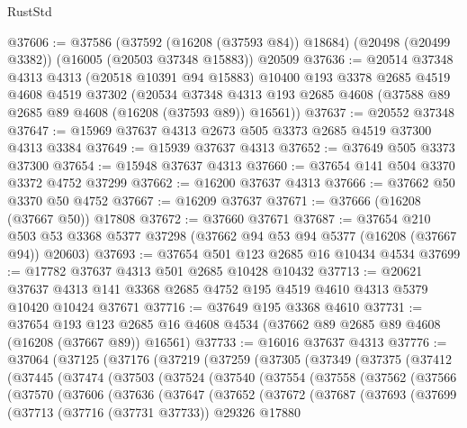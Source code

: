 \begin{lexlean}{RustStd}
\begin{coremodule}
@37606 := @37586
    (@37592 (@16208 (@37593 @84)) @18684)
    (@20498 (@20499 @3382))
    (@16005 (@20503 @37348 @15883))
    @20509
@37636 := @20514
    @37348
    @4313
    @4313
    (@20518 @10391 @94 @15883)
    @10400
    @193
    @3378
    @2685
    @4519
    @4608
    @4519
    @37302
    (@20534 @37348 @4313 @193 @2685 @4608 (@37588 @89 @2685 @89 @4608 (@16208 (@37593 @89)) @16561))
@37637 := @20552 @37348
@37647 := @15969 @37637 @4313 @2673 @505 @3373 @2685 @4519 @37300 @4313 @3384
@37649 := @15939 @37637 @4313
@37652 := @37649 @505 @3373 @37300
@37654 := @15948 @37637 @4313
@37660 := @37654 @141 @504 @3370 @3372 @4752 @37299
@37662 := @16200 @37637 @4313
@37666 := @37662 @50 @3370 @50 @4752
@37667 := @16209 @37637
@37671 := @37666 (@16208 (@37667 @50)) @17808
@37672 := @37660 @37671
@37687 := @37654
    @210
    @503
    @53
    @3368
    @5377
    @37298
    (@37662 @94 @53 @94 @5377 (@16208 (@37667 @94)) @20603)
@37693 := @37654 @501 @123 @2685 @16 @10434 @4534
@37699 := @17782 @37637 @4313 @501 @2685 @10428 @10432
@37713 := @20621
    @37637
    @4313
    @141
    @3368
    @2685
    @4752
    @195
    @4519
    @4610
    @4313
    @5379
    @10420
    @10424
    @37671
@37716 := @37649 @195 @3368 @4610
@37731 := @37654
    @193
    @123
    @2685
    @16
    @4608
    @4534
    (@37662 @89 @2685 @89 @4608 (@16208 (@37667 @89)) @16561)
@37733 := @16016 @37637 @4313
@37776 := @37064
    (@37125
      (@37176
        (@37219
          (@37259
            (@37305
              (@37349
                (@37375
                  (@37412
                    (@37445
                      (@37474
                        (@37503
                          (@37524
                            (@37540
                              (@37554
                                (@37558
                                  (@37562
                                    (@37566
                                      (@37570
                                        (@37606
                                          (@37636
                                            (@37647
                                              (@37652
                                                (@37672
                                                  (@37687
                                                    (@37693
                                                      (@37699
                                                        (@37713
                                                          (@37716 (@37731 @37733))
                                                          @29326
                                                          @17880

\end{coremodule}
\end{lexlean}
